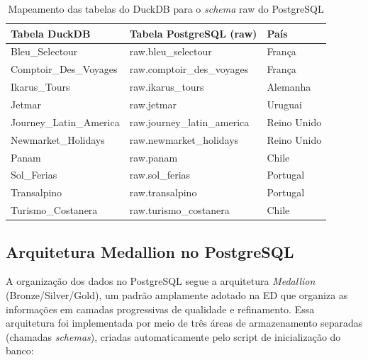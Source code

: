 \begin{table}[H]
\centering
\begin{tabular}{|l|l|l|}
\hline
\textbf{Tabela DuckDB} & \textbf{Tabela PostgreSQL (raw)} & \textbf{País} \\ \hline
Bleu\_Selectour        & raw.bleu\_selectour        & França      \\ \hline
Comptoir\_Des\_Voyages  & raw.comptoir\_des\_voyages  & França      \\ \hline
Ikarus\_Tours           & raw.ikarus\_tours           & Alemanha    \\ \hline
Jetmar                  & raw.jetmar                  & Uruguai     \\ \hline
Journey\_Latin\_America & raw.journey\_latin\_america & Reino Unido \\ \hline
Newmarket\_Holidays     & raw.newmarket\_holidays     & Reino Unido \\ \hline
Panam                   & raw.panam                   & Chile       \\ \hline
Sol\_Ferias             & raw.sol\_ferias             & Portugal    \\ \hline
Transalpino             & raw.transalpino             & Portugal    \\ \hline
Turismo\_Costanera      & raw.turismo\_costanera      & Chile       \\ \hline
\end{tabular}
\caption{Mapeamento das tabelas do DuckDB para o \textit{schema} raw do PostgreSQL}
\label{tab:tabelas_migradas}
\end{table}

\subsection{Arquitetura Medallion no PostgreSQL}

A organização dos dados no PostgreSQL segue a arquitetura \textit{Medallion}
(Bronze/Silver/Gold), um padrão amplamente adotado na ED que organiza
as informações em camadas progressivas de qualidade e refinamento. Essa arquitetura
foi implementada por meio de três áreas de armazenamento separadas (chamadas
\textit{schemas}), criadas automaticamente pelo script de inicialização do banco:

